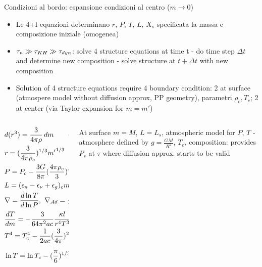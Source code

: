 \begin{frame}{Condizioni al bordo: espansione condizioni al centro ($m\to0$)}
\begin{itemize}
\item Le 4+I equazioni determinano $r$, $P$, $T$, $L$, $X_s$ specificata la massa e composizione iniziale (omogenea)
\item $\tau_n\gg\tau_{KH}\gg\tau_{dyn}$: solve 4 structure equations at time t - do time step $\Delta t$ and determine new composition - solve structure at $t+\Delta t$ with new composition
\item Solution of 4 structure equations require 4 boundary condition: 2 at surface (atmospere model without diffusion approx, PP geometry), parametri $\rho_c,T_c$; 2 at center (via Taylor expansion for $m=m'$)
\end{itemize}
\begin{columns}[T]
\begin{column}{0.65\textwidth}
\begin{align*}
    &d(r^3)=\frac{3}{4\pi\rho}\,dm\tag{to be integrated for $\rho=\rho_c$:}\\
&r=(\frac{3}{4\pi\rho_c})\expy{1/3}{m'}\expy{1/3}\\
&P=P_c-\frac{3G}{8\pi}(\frac{4\pi\rho_c}{3})\expy{4/3}{m'}\expy{2/3}\tag{r into HE and integrate}\\
&L=(\epsilon_n-\epsilon_{\nu}+\epsilon_g)_cm'\\
&\nabla=\TDly{P}{T},\ \nad{}=\frac{P\delta}{T\rho c_P},\ \nrad{}=\frac{3}{16\pi acG}\frac{\kappa lP}{mT^4}\\
&\TDy{m}{T}=-\frac{3}{64\pi^2ac}\frac{\kappa l}{r^4T^3}\tag{rad}\\
&T^4=T_c^4-\frac{1}{2ac}(\frac{3}{4\pi})\expy{2/3}\kappa_c\epsilon_c\rho_c\expy{4/3}{m'}\expy{2/3}\tag{rad}\\
&\ln{T}=\ln{T_c}-(\frac{\pi}{6})\expy{1/3}G\frac{{\nad}_c\rho_c\expy{4/3}}{P_c}{m'}\expy{2/3}\tag{con}
\end{align*}
\end{column}
\begin{column}{0.35\textwidth}
At surface $m=M$, $L=L_s$, atmospheric model for $P$, $T$ - atmosphere defined by $g=\frac{GM}{R^2}$, $T_e$, composition: provides $P_s$ at $\tau$ where diffusion approx. starts to be valid
\end{column}
\end{columns}
\end{frame}

